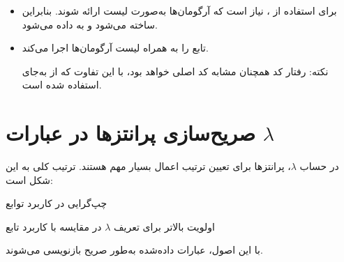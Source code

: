 \documentclass[11pt, a4paper, oneside]{article}
\newcounter{itemadded}
\let\LaTeXStandardEnumerateBegin\enumerate
\let\LaTeXStandardEnumerateEnd\endenumerate
\renewenvironment{enumerate}{%
	\LaTeXStandardEnumerateBegin%
	\setcounter{itemadded}{0}
}{%
	\LaTeXStandardEnumerateEnd%
}%
\begin{document}
\begin{itemize}
\begin{enumerate}
						\item برای استفاده از ، نیاز است که آرگومان‌ها به‌صورت لیست ارائه شوند. بنابراین  ساخته می‌شود و به  داده می‌شود.
						
						\item {} تابع  را به همراه لیست آرگومان‌ها اجرا می‌کند.
						
					\end{enumerate}
					
					نکته: رفتار کد همچنان مشابه کد اصلی خواهد بود، با این تفاوت که از  به‌جای  استفاده شده است.
		
			\end{itemize}
			
	\section{صریح‌سازی پرانتزها در عبارات $\lambda$}
	
		در حساب $\lambda$، پرانتزها برای تعیین ترتیب اعمال بسیار مهم هستند. ترتیب کلی به این شکل است:
		
		\begin{enumerate}
			
			\item چپ‌گرایی در کاربرد توابع
			
			\item اولویت بالاتر برای تعریف $\lambda$ در مقایسه با کاربرد تابع
			
		\end{enumerate}
		
		با این اصول، عبارات داده‌شده به‌طور صریح بازنویسی می‌شوند.
		
\end{document}
